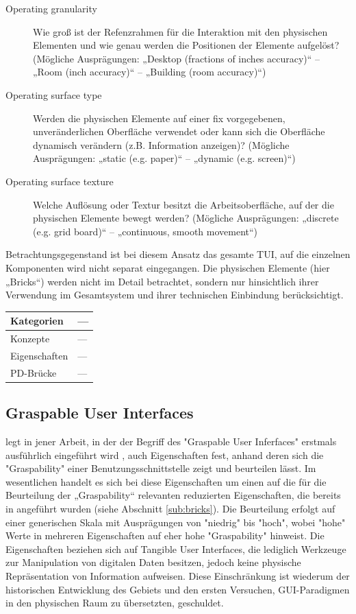 \begin{description}
	\item[Operating granularity] Wie groß ist der Refenzrahmen für die Interaktion mit den physischen Elementen und wie genau werden die Positionen der Elemente aufgelöst? (Mögliche Ausprägungen: „Desktop (fractions of inches accuracy)“ -- „Room (inch accuracy)“ -- „Building (room accuracy)“)
	\item[Operating surface type] Werden die physischen Elemente auf einer fix vorgegebenen, unveränderlichen Oberfläche verwendet oder kann sich die Oberfläche dynamisch verändern (z.B. Information anzeigen)? (Mögliche Ausprägungen: „static (e.g. paper)“ -- „dynamic (e.g. screen)“)
	\item[Operating surface texture] Welche Auflösung oder Textur besitzt die Arbeitsoberfläche, auf der die physischen Elemente bewegt werden? (Mögliche Ausprägungen: „discrete (e.g. grid board)“ -- „continuous, smooth movement“)
\end{description}

Betrachtungsgegenstand ist bei diesem Ansatz das gesamte \gls{TUI}, auf die einzelnen Komponenten wird nicht separat eingegangen. Die physischen Elemente (hier „Bricks“) werden nicht im Detail betrachtet, sondern nur hinsichtlich ihrer Verwendung im Gesamtsystem und ihrer technischen Einbindung berücksichtigt.

\begin{tabular}{| p{3cm} | p{10cm} |}
  \hline
  Kategorien & --- \\ \hline
  Konzepte & --- \\ \hline
  Eigenschaften & --- \\ \hline
  PD-Brücke & --- \\ \hline
\end{tabular} 


\subsection{Graspable User Interfaces} %
\label{sub:graspable_user_interfaces}

\citeauthor{Fitzmaurice96} legt in jener Arbeit, in der der Begriff des "Graspable User Inferfaces" erstmals ausführlich eingeführt wird \citep{Fitzmaurice96}, auch Eigenschaften fest, anhand deren sich die "Graspability" einer Benutzungsschnittstelle zeigt und beurteilen lässt. Im wesentlichen handelt es sich bei diese Eigenschaften um einen auf die für die Beurteilung der „Graspability“ relevanten reduzierten Eigenschaften, die bereits in \citep{Fitzmaurice95} angeführt wurden (siehe Abschnitt \ref{sub:bricks}). Die Beurteilung erfolgt auf einer generischen Skala mit Ausprägungen von "niedrig" bis "hoch", wobei "hohe" Werte in mehreren Eigenschaften auf eher hohe "Graspability" hinweist. Die Eigenschaften beziehen sich auf Tangible User Interfaces, die lediglich Werkzeuge zur Manipulation von digitalen Daten besitzen, jedoch keine physische Repräsentation von Information aufweisen. Diese Einschränkung ist wiederum der historischen Entwicklung des Gebiets und den ersten Versuchen, GUI-Paradigmen in den physischen Raum zu übersetzten, geschuldet.

